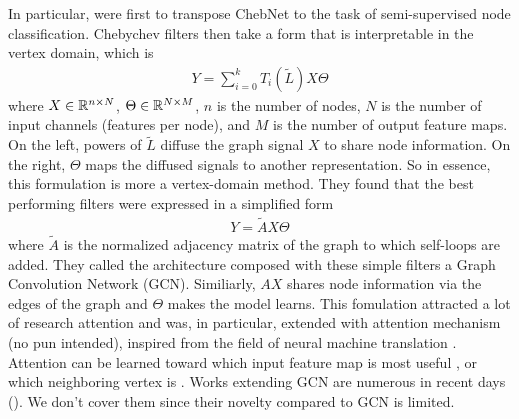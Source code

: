 In particular, \cite{kipf2016semi} were first to transpose ChebNet to the task of semi-supervised node classification. Chebychev filters then take a form that is interpretable in the vertex domain, which is
\begin{gather}
Y = \displaystyle\sum_{i=0}^k T_i(\widetilde{L}) X \Theta
\end{gather}
where $X \in \mathbb{R}^{n \times N}$, $\Theta \in \mathbb{R}^{N \times M}$, $n$ is the number of nodes, $N$ is the number of input channels (features per node), and $M$ is the number of output feature maps. On the left, powers of $\widetilde{L}$ diffuse the graph signal $X$ to share node information. On the right, $\Theta$ maps the diffused signals to another representation. So in essence, this formulation is more a vertex-domain method. They found that the best performing filters were expressed in a simplified form
\begin{gather}
Y = \widetilde{A} X \Theta
\end{gather}
where $\widetilde{A}$ is the normalized adjacency matrix of the graph to which self-loops are added. They called the architecture composed with these simple filters a Graph Convolution Network (GCN). Similiarly, $AX$ shares node information via the edges of the graph and $\Theta$ makes the model learns. This fomulation attracted a lot of research attention and was, in particular, extended with attention mechanism (no pun intended), inspired from the field of neural machine translation \citep{bahdanau2014neural}. Attention can be learned toward which input feature map is most useful \citep{velickovic2017graph}, or which neighboring vertex is \citep{lee2018attention}. Works extending GCN are numerous in recent days (\eg \cite{niepert2018towards}). We don't cover them since their novelty compared to GCN is limited.

